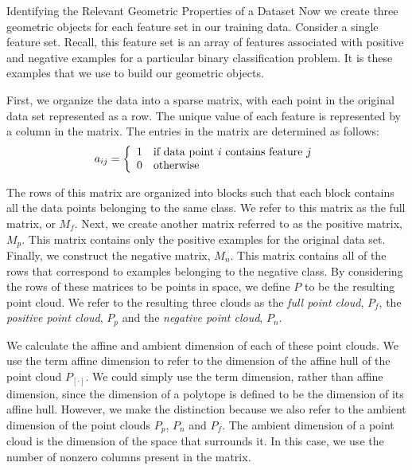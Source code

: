 \documentclass{llncs}
\begin{document}
\begin{section}{Identifying the Relevant Geometric Properties of a Dataset}
Now we create three geometric objects for each feature set in our training data. Consider a single feature set. Recall, this feature set is an array of features associated with positive and negative examples for a particular binary classification problem. It is these examples that we use to build our geometric objects.

First, we organize the data into a sparse matrix, with each point in the original data set represented as a row. The unique value of each feature is represented by a column in the matrix. The entries in the matrix are determined as follows:
$$a_{ij} =\left\{
\begin{array}{c l}     
    1 & \text{if data point $i$ contains feature $j$}\\
    0 & \text{otherwise}
\end{array}\right.$$

The rows of this matrix are organized into blocks such that each block contains all the data points belonging to the same class. We refer to this matrix as the full matrix, or $M_f$. Next, we create another matrix referred to as the positive matrix, $M_p$. This matrix contains only the positive examples for the original data set. Finally, we construct the negative matrix, $M_n$. This matrix contains all of the rows that correspond to examples belonging to the negative class. By considering the rows of these matrices to be points in space, we define $P$ to be the resulting point cloud. We refer to the resulting three clouds as the {\em full point cloud}, $P_f$, the {\em positive point cloud}, $P_p$ and the {\em negative point cloud}, $P_n$. 


We calculate the affine and ambient dimension of each of these point clouds. We use the term affine dimension to refer to the dimension of the affine hull of the point cloud $P_{[\cdot]}$. We could simply use the term dimension, rather than affine dimension, since the dimension of a polytope is defined to be the dimension of its affine hull\cite{Gallier}. However, we make the distinction because we also refer to the ambient dimension of the point clouds $P_p$, $P_n$ and $P_f$.  The ambient dimension of a point cloud is the dimension of the space that surrounds it. In this case, we use the number of nonzero columns present in the matrix.



\end{section}
\end{document}
